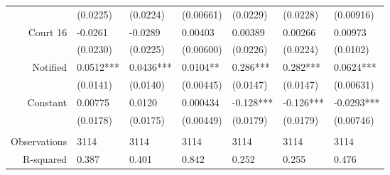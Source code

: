 \begin{tabular}{rrrrrrr}
      & \multicolumn{1}{l}{(0.0225)} & \multicolumn{1}{l}{(0.0224)} & \multicolumn{1}{l}{(0.00661)} & \multicolumn{1}{l}{(0.0229)} & \multicolumn{1}{l}{(0.0228)} & \multicolumn{1}{l}{(0.00916)} \\
Court 16 & \multicolumn{1}{l}{-0.0261} & \multicolumn{1}{l}{-0.0289} & \multicolumn{1}{l}{0.00403} & \multicolumn{1}{l}{0.00389} & \multicolumn{1}{l}{0.00266} & \multicolumn{1}{l}{0.00973} \\
      & \multicolumn{1}{l}{(0.0230)} & \multicolumn{1}{l}{(0.0225)} & \multicolumn{1}{l}{(0.00600)} & \multicolumn{1}{l}{(0.0226)} & \multicolumn{1}{l}{(0.0224)} & \multicolumn{1}{l}{(0.0102)} \\
Notified & \multicolumn{1}{l}{0.0512***} & \multicolumn{1}{l}{0.0436***} & \multicolumn{1}{l}{0.0104**} & \multicolumn{1}{l}{0.286***} & \multicolumn{1}{l}{0.282***} & \multicolumn{1}{l}{0.0624***} \\
      & \multicolumn{1}{l}{(0.0141)} & \multicolumn{1}{l}{(0.0140)} & \multicolumn{1}{l}{(0.00445)} & \multicolumn{1}{l}{(0.0147)} & \multicolumn{1}{l}{(0.0147)} & \multicolumn{1}{l}{(0.00631)} \\
      \midrule
Constant  & \multicolumn{1}{l}{0.00775} & \multicolumn{1}{l}{0.0120} & \multicolumn{1}{l}{0.000434} & \multicolumn{1}{l}{-0.128***} & \multicolumn{1}{l}{-0.126***} & \multicolumn{1}{l}{-0.0293***} \\
      & \multicolumn{1}{l}{(0.0178)} & \multicolumn{1}{l}{(0.0175)} & \multicolumn{1}{l}{(0.00449)} & \multicolumn{1}{l}{(0.0179)} & \multicolumn{1}{l}{(0.0179)} & \multicolumn{1}{l}{(0.00746)} \\
      & \multicolumn{1}{l}{} & \multicolumn{1}{l}{} & \multicolumn{1}{l}{} & \multicolumn{1}{l}{} & \multicolumn{1}{l}{} & \multicolumn{1}{l}{} \\
Observations & \multicolumn{1}{l}{3114} & \multicolumn{1}{l}{3114} & \multicolumn{1}{l}{3114} & \multicolumn{1}{l}{3114} & \multicolumn{1}{l}{3114} & \multicolumn{1}{l}{3114} \\
R-squared & \multicolumn{1}{l}{0.387} & \multicolumn{1}{l}{0.401} & \multicolumn{1}{l}{0.842} & \multicolumn{1}{l}{0.252} & \multicolumn{1}{l}{0.255} & \multicolumn{1}{l}{0.476} \\
\bottomrule
\end{tabular}%
